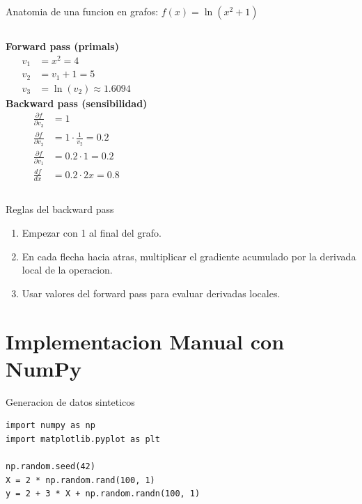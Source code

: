 \documentclass[aspectratio=169, 10pt, xcolor=table]{beamer}
\begin{document}
\begin{frame}{Anatomia de una funcion en grafos: $f(x)=\ln(x^2+1)$}
    \begin{columns}[t]
        \textbf{Forward pass (primals)}
        \begin{align*}
            v_1 &= x^2 = 4 \\
            v_2 &= v_1 + 1 = 5 \\
            v_3 &= \ln(v_2) \approx 1.6094
        \end{align*}
        \textbf{Backward pass (sensibilidad)}
        \begin{align*}
            \frac{\partial f}{\partial v_3} &= 1 \\
            \frac{\partial f}{\partial v_2} &= 1\cdot \frac{1}{v_2}=0.2 \\
            \frac{\partial f}{\partial v_1} &= 0.2\cdot 1 = 0.2 \\
            \frac{df}{dx} &= 0.2\cdot 2x = 0.8
        \end{align*}
    \end{columns}
\end{frame}

\begin{frame}{Reglas del backward pass}
    \begin{enumerate}
        \item Empezar con 1 al final del grafo.
        \item En cada flecha hacia atras, multiplicar el gradiente acumulado por la derivada local de la operacion.
        \item Usar valores del forward pass para evaluar derivadas locales.
    \end{enumerate}
\end{frame}

\section{Implementacion Manual con NumPy}

\begin{frame}[fragile]{Generacion de datos sinteticos}
    \begin{lstlisting}
import numpy as np
import matplotlib.pyplot as plt

np.random.seed(42)
X = 2 * np.random.rand(100, 1)
y = 2 + 3 * X + np.random.randn(100, 1)
    \end{lstlisting}
\end{frame}
\end{document}
